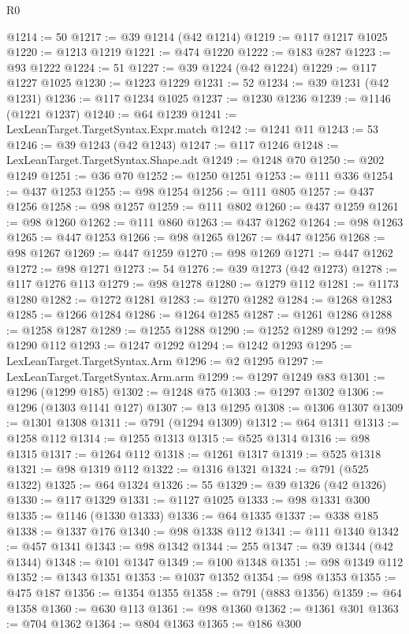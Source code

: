 \begin{lexlean}{R0}
\begin{coremodule}
@1214 := 50
@1217 := @39 @1214 (@42 @1214)
@1219 := @117 @1217 @1025
@1220 := @1213 @1219
@1221 := @474 @1220
@1222 := @183 @287
@1223 := @93 @1222
@1224 := 51
@1227 := @39 @1224 (@42 @1224)
@1229 := @117 @1227 @1025
@1230 := @1223 @1229
@1231 := 52
@1234 := @39 @1231 (@42 @1231)
@1236 := @117 @1234 @1025
@1237 := @1230 @1236
@1239 := @1146 (@1221 @1237)
@1240 := @64 @1239
@1241 := LexLeanTarget.TargetSyntax.Expr.match
@1242 := @1241 @11
@1243 := 53
@1246 := @39 @1243 (@42 @1243)
@1247 := @117 @1246
@1248 := LexLeanTarget.TargetSyntax.Shape.adt
@1249 := @1248 @70
@1250 := @202 @1249
@1251 := @36 @70
@1252 := @1250 @1251
@1253 := @111 @336
@1254 := @437 @1253
@1255 := @98 @1254
@1256 := @111 @805
@1257 := @437 @1256
@1258 := @98 @1257
@1259 := @111 @802
@1260 := @437 @1259
@1261 := @98 @1260
@1262 := @111 @860
@1263 := @437 @1262
@1264 := @98 @1263
@1265 := @447 @1253
@1266 := @98 @1265
@1267 := @447 @1256
@1268 := @98 @1267
@1269 := @447 @1259
@1270 := @98 @1269
@1271 := @447 @1262
@1272 := @98 @1271
@1273 := 54
@1276 := @39 @1273 (@42 @1273)
@1278 := @117 @1276 @113
@1279 := @98 @1278
@1280 := @1279 @112
@1281 := @1173 @1280
@1282 := @1272 @1281
@1283 := @1270 @1282
@1284 := @1268 @1283
@1285 := @1266 @1284
@1286 := @1264 @1285
@1287 := @1261 @1286
@1288 := @1258 @1287
@1289 := @1255 @1288
@1290 := @1252 @1289
@1292 := @98 @1290 @112
@1293 := @1247 @1292
@1294 := @1242 @1293
@1295 := LexLeanTarget.TargetSyntax.Arm
@1296 := @2 @1295
@1297 := LexLeanTarget.TargetSyntax.Arm.arm
@1299 := @1297 @1249 @83
@1301 := @1296 (@1299 @185)
@1302 := @1248 @75
@1303 := @1297 @1302
@1306 := @1296 (@1303 @1141 @127)
@1307 := @13 @1295
@1308 := @1306 @1307
@1309 := @1301 @1308
@1311 := @791 (@1294 @1309)
@1312 := @64 @1311
@1313 := @1258 @112
@1314 := @1255 @1313
@1315 := @525 @1314
@1316 := @98 @1315
@1317 := @1264 @112
@1318 := @1261 @1317
@1319 := @525 @1318
@1321 := @98 @1319 @112
@1322 := @1316 @1321
@1324 := @791 (@525 @1322)
@1325 := @64 @1324
@1326 := 55
@1329 := @39 @1326 (@42 @1326)
@1330 := @117 @1329
@1331 := @1127 @1025
@1333 := @98 @1331 @300
@1335 := @1146 (@1330 @1333)
@1336 := @64 @1335
@1337 := @338 @185
@1338 := @1337 @176
@1340 := @98 @1338 @112
@1341 := @111 @1340
@1342 := @457 @1341
@1343 := @98 @1342
@1344 := 255
@1347 := @39 @1344 (@42 @1344)
@1348 := @101 @1347
@1349 := @100 @1348
@1351 := @98 @1349 @112
@1352 := @1343 @1351
@1353 := @1037 @1352
@1354 := @98 @1353
@1355 := @475 @187
@1356 := @1354 @1355
@1358 := @791 (@883 @1356)
@1359 := @64 @1358
@1360 := @630 @113
@1361 := @98 @1360
@1362 := @1361 @301
@1363 := @704 @1362
@1364 := @804 @1363
@1365 := @186 @300

\end{coremodule}
\end{lexlean}
